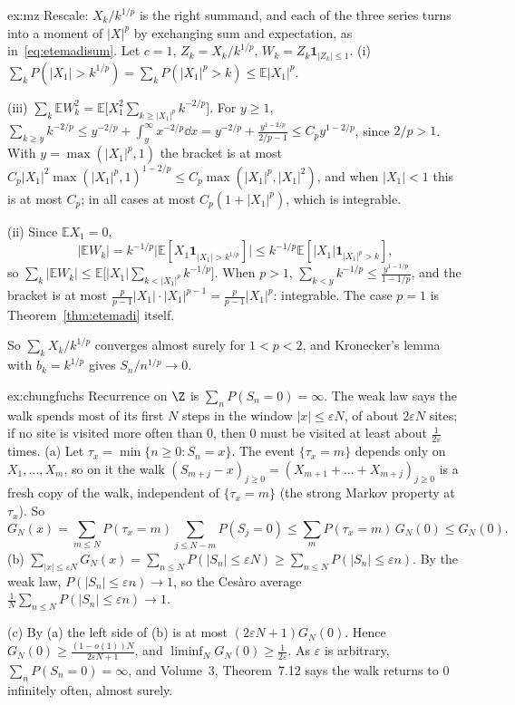 \begin{solution}{ex:mz}
\idea Rescale: $X_k/k^{1/p}$ is the right summand, and each of the three series turns into a moment of $|X|^p$ by exchanging sum and expectation, as
in~\eqref{eq:etemadisum}.
\writeup Let $c=1$, $Z_k=X_k/k^{1/p}$, $W_k=Z_k\mathbf 1_{|Z_k|\le1}$. (i) $\sum_kP(|X_1|>k^{1/p})=\sum_kP(|X_1|^p>k)\le\mathbb E|X_1|^p$.

(iii) $\sum_k\mathbb E W_k^2=\mathbb E\bigl[X_1^2\sum_{k\ge|X_1|^p}k^{-2/p}\bigr]$. For $y\ge1$, $\sum_{k\ge y}k^{-2/p}\le y^{-2/p}+\int_y^\infty x^{-2/p}\dd x=
y^{-2/p}+\frac{y^{1-2/p}}{2/p-1}\le C_py^{1-2/p}$, since $2/p>1$. With $y=\max(|X_1|^p,1)$ the bracket is at most $C_p|X_1|^2\max(|X_1|^p,1)^{1-2/p}\le C_p\max(|X_1|^p,|X_1|^2)$,
and when $|X_1|<1$ this is at most $C_p$; in all cases at most $C_p(1+|X_1|^p)$, which is integrable.

(ii) Since $\mathbb E X_1=0$,
\[
|\mathbb E W_k|=k^{-1/p}\bigl|\mathbb E[X_1\mathbf 1_{|X_1|>k^{1/p}}]\bigr|\le k^{-1/p}\mathbb E[|X_1|\mathbf 1_{|X_1|^p>k}],
\]
so $\sum_k|\mathbb E W_k|\le\mathbb E\bigl[|X_1|\sum_{k<|X_1|^p}k^{-1/p}\bigr]$. When $p>1$, $\sum_{k<y}k^{-1/p}\le\frac{y^{1-1/p}}{1-1/p}$, and the bracket is at most
$\frac p{p-1}|X_1|\cdot|X_1|^{p-1}=\frac p{p-1}|X_1|^p$: integrable. The case $p=1$ is Theorem~\ref{thm:etemadi} itself.

So $\sum_kX_k/k^{1/p}$ converges almost surely for $1<p<2$, and Kronecker's lemma with $b_k=k^{1/p}$ gives $S_n/n^{1/p}\to0$.
\end{solution}

\begin{solution}{ex:chungfuchs}
\idea Recurrence on $\Z$ is $\sum_nP(S_n=0)=\infty$. The weak law says the walk spends most of its first $N$ steps in the window $|x|\le\varepsilon N$, of
about $2\varepsilon N$ sites; if no site is visited more often than $0$, then $0$ must be visited at least about $\frac1{2\varepsilon}$ times.
\writeup (a) Let $\tau_x=\min\{n\ge0:S_n=x\}$. The event $\{\tau_x=m\}$ depends only on $X_1,\dots,X_m$, so on it the walk $(S_{m+j}-x)_{j\ge0}=(X_{m+1}+\dots+X_{m+j})_{j\ge0}$ is a
fresh copy of the walk, independent of $\{\tau_x=m\}$ (the strong Markov property at $\tau_x$). So
\[
G_N(x)=\sum_{m\le N}P(\tau_x=m)\sum_{j\le N-m}P(S_j=0)\le\sum_mP(\tau_x=m)\,G_N(0)\le G_N(0).
\]
(b) $\sum_{|x|\le\varepsilon N}G_N(x)=\sum_{n\le N}P(|S_n|\le\varepsilon N)\ge\sum_{n\le N}P(|S_n|\le\varepsilon n)$. By the weak law, $P(|S_n|\le\varepsilon n)\to1$,
so the Ces\`aro average $\frac1N\sum_{n\le N}P(|S_n|\le\varepsilon n)\to1$.

(c) By (a) the left side of (b) is at most $(2\varepsilon N+1)G_N(0)$. Hence $G_N(0)\ge\frac{(1-o(1))N}{2\varepsilon N+1}$, and $\liminf_NG_N(0)\ge\frac1{2\varepsilon}$.
As $\varepsilon$ is arbitrary, $\sum_nP(S_n=0)=\infty$, and Volume~3, Theorem~7.12 says the walk returns to $0$ infinitely often, almost surely.
\end{solution}

